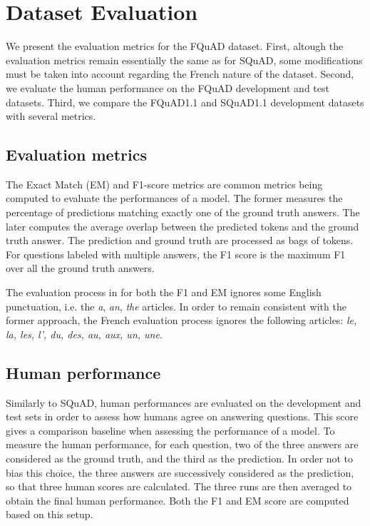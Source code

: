 \documentclass{article}
\begin{document}
\section{Dataset Evaluation}
\label{section:dataset_evaluation}
We present the evaluation metrics for the FQuAD dataset.
First, altough the evaluation metrics remain essentially the same as for SQuAD, some modifications must be taken into account regarding the French nature of the dataset.
Second, we evaluate the human performance on the FQuAD development and test datasets.
Third, we compare the FQuAD1.1 and SQuAD1.1 development datasets with several metrics.

\subsection{Evaluation metrics}

The Exact Match (EM) and F1-score metrics are common metrics being computed to evaluate the performances of a model.
The former measures the percentage of predictions matching exactly one of the ground truth answers.
The later computes the average overlap between the predicted tokens and the ground truth answer.
The prediction and ground truth are processed as bags of tokens. 
For questions labeled with multiple answers, the F1 score is the maximum F1 over all the ground truth answers.

The evaluation process in \citep{rajpurkar-etal-2016-squad} for both the F1 and EM ignores some English punctuation, i.e. the \textit{a}, \textit{an}, \textit{the} articles.
In order to remain consistent with the former approach, the French evaluation process ignores the following articles: \textit{le, la, les, l', du, des, au, aux, un, une}.

\subsection{Human performance}

Similarly to SQuAD, human performances are evaluated on the development and test sets in order to assess how humans agree on answering questions.
This score gives a comparison baseline when assessing the performance of a model.
To measure the human performance, for each question, two of the three answers are considered as the ground truth, and the third as the prediction. 
In order not to bias this choice, the three answers are successively considered as the prediction, so that three human scores are calculated. 
The three runs are then averaged to obtain the final human performance.
Both the F1 and EM score are computed based on this setup.
\end{document}

